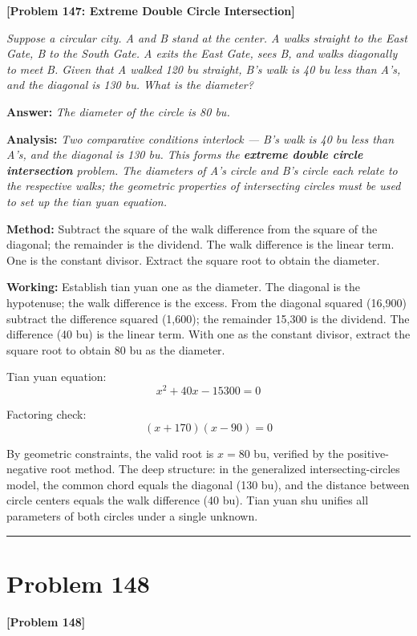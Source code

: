 \documentclass[11pt,a4paper]{book}
\newcommand{\answer}[1]{\noindent\textbf{\color{anacolor}Answer: }\textit{#1}\par}
\newcommand{\method}[1]{\noindent\textbf{\color{methodcolor}Method: }#1\par}
\newcommand{\working}[1]{\noindent\textbf{\color{workcolor}Working: }#1\par}
\newcommand{\analysis}[1]{\noindent\textbf{\color{anacolor}Analysis: }\textit{#1}\par}
\newcommand{\shortline}{\noindent\rule{0.5\textwidth}{0.4pt}\par}
\begin{document}
\noindent\textbf{\color{probcolor}[Problem 147: Extreme Double Circle Intersection]}

\textit{Suppose a circular city. A and B stand at the center. A walks straight to the East Gate, B to the South Gate. A exits the East Gate, sees B, and walks diagonally to meet B. Given that A walked 120 bu straight, B's walk is 40 bu less than A's, and the diagonal is 130 bu. What is the diameter?}

\answer{The diameter of the circle is 80 bu.}

\analysis{Two comparative conditions interlock --- B's walk is 40 bu less than A's, and the diagonal is 130 bu. This forms the \textbf{extreme double circle intersection} problem. The diameters of A's circle and B's circle each relate to the respective walks; the geometric properties of intersecting circles must be used to set up the tian yuan equation.}

\method{Subtract the square of the walk difference from the square of the diagonal; the remainder is the dividend. The walk difference is the linear term. One is the constant divisor. Extract the square root to obtain the diameter.}

\working{Establish tian yuan one as the diameter. The diagonal is the hypotenuse; the walk difference is the excess. From the diagonal squared (16,900) subtract the difference squared (1,600); the remainder 15,300 is the dividend. The difference (40 bu) is the linear term. With one as the constant divisor, extract the square root to obtain 80 bu as the diameter.

Tian yuan equation:
$$x^2 + 40x - 15300 = 0$$

Factoring check:
$$(x + 170)(x - 90) = 0$$

By geometric constraints, the valid root is $x = 80$ bu, verified by the positive-negative root method. The deep structure: in the generalized intersecting-circles model, the common chord equals the diagonal (130 bu), and the distance between circle centers equals the walk difference (40 bu). Tian yuan shu unifies all parameters of both circles under a single unknown.}

\shortline

\section{Problem 148}
\label{sec:prob148}

\noindent\textbf{\color{probcolor}[Problem 148]}
\end{document}

